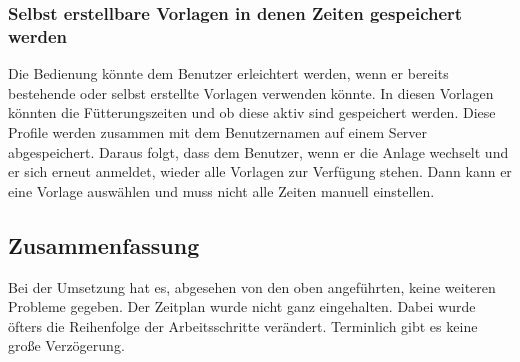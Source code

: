 \subsubsection{Selbst erstellbare Vorlagen in denen Zeiten gespeichert werden}
Die Bedienung könnte dem Benutzer erleichtert werden, wenn er bereits bestehende oder selbst erstellte Vorlagen verwenden könnte. In diesen Vorlagen könnten die Fütterungszeiten und ob diese aktiv sind gespeichert werden. Diese Profile werden zusammen mit dem Benutzernamen auf einem Server abgespeichert. Daraus folgt, dass dem Benutzer, wenn er die Anlage wechselt und er sich erneut anmeldet, wieder alle Vorlagen zur Verfügung stehen. Dann kann er eine Vorlage auswählen und muss nicht alle Zeiten manuell einstellen.

\subsection{Zusammenfassung}
Bei der Umsetzung hat es, abgesehen von den oben angeführten, keine weiteren Probleme gegeben. Der Zeitplan wurde nicht ganz eingehalten. Dabei wurde öfters die Reihenfolge der Arbeitsschritte verändert. Terminlich gibt es keine große Verzögerung.